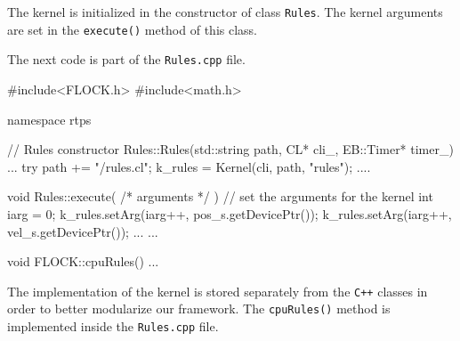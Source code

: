 The kernel is initialized in the constructor of class \texttt{Rules}. The kernel arguments are set in the \texttt{execute()} method of this class. 

The next code is part of the \texttt{Rules.cpp} file.

\begin{cppcode}{0}
#include<FLOCK.h>
#include<math.h>

namespace rtps
{
	// Rules constructor
	Rules::Rules(std::string path, CL* cli_, EB::Timer* timer_)
	{
		...
		try
		{
			path += "/rules.cl";
			k_rules = Kernel(cli, path, "rules");
		}
		....
	}

	void Rules::execute( /* arguments */ )
	{
		// set the arguments for the kernel
		int iarg = 0;
		k_rules.setArg(iarg++, pos_s.getDevicePtr());
		k_rules.setArg(iarg++, vel_s.getDevicePtr());
		...
	}
	...
	
	void FLOCK::cpuRules()
	{
		...
	}
}
\end{cppcode}
\vspace{16pt}

The implementation of the kernel is stored separately from the \texttt{C++} classes in order to better modularize our framework. The \texttt{cpuRules()} method is implemented inside the \texttt{Rules.cpp} file. 





